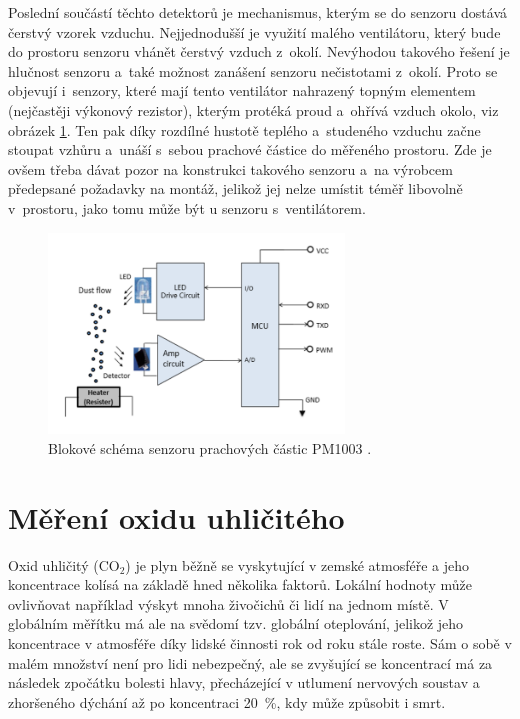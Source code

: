 Poslední součástí těchto detektorů je mechanismus, kterým se do senzoru dostává čerstvý vzorek vzduchu. Nejjednodušší je využití malého ventilátoru, který bude do prostoru senzoru vhánět čerstvý vzduch z~okolí. Nevýhodou takového řešení je hlučnost senzoru a~také možnost zanášení senzoru nečistotami z~okolí. Proto se objevují i~senzory, které mají tento ventilátor nahrazený topným elementem (nejčastěji výkonový rezistor), kterým protéká proud a~ohřívá vzduch okolo, viz obrázek \ref{fig_dustSensorPrinciple}. Ten pak díky rozdílné hustotě teplého a~studeného vzduchu začne stoupat vzhůru a~unáší s~sebou prachové částice do měřeného prostoru. Zde je ovšem třeba dávat pozor na konstrukci takového senzoru a~na výrobcem předepsané požadavky na montáž, jelikož jej nelze umístit téměř libovolně v~prostoru, jako tomu může být u senzoru s~ventilátorem.

\begin{figure}
    \centering
    \includegraphics[width=0.70\textwidth]{obrazky/dustSensorPrinciple.png}
    \caption[Blokové schéma senzoru prachových částic PM1003.]{Blokové schéma senzoru prachových částic PM1003 \cite{PM1003Datasheet}.}
    \label{fig_dustSensorPrinciple}
\end{figure}

\section{Měření oxidu uhličitého}

Oxid uhličitý (CO$_2$) je plyn běžně se vyskytující v zemské atmosféře a jeho koncentrace kolísá na základě hned několika faktorů. Lokální hodnoty může ovlivňovat například výskyt mnoha živočichů či lidí na jednom místě. V globálním měřítku má ale na svědomí tzv. globální oteplování, jelikož jeho koncentrace v atmosféře díky lidské činnosti rok od roku stále roste. Sám o sobě v malém množství není pro lidi nebezpečný, ale se zvyšující se koncentrací má za následek zpočátku bolesti hlavy, přecházející v utlumení nervových soustav a zhoršeného dýchání až po koncentraci 20~\%, kdy může způsobit i smrt.

